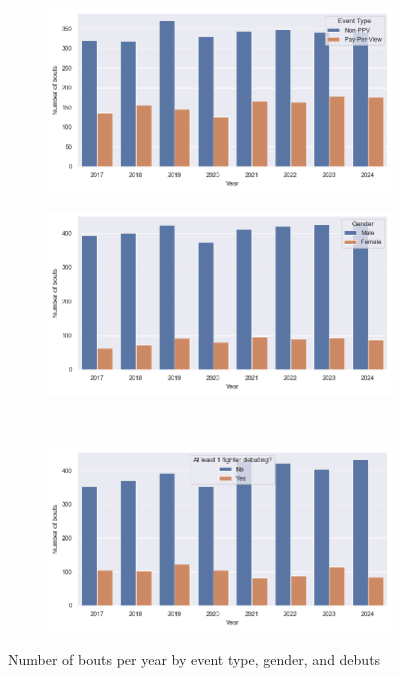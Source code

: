 \documentclass[12pt,twoside]{report}
\begin{document}
\begin{figure}[!htb]
\centering
\captionsetup{justification=centering}
\begin{subfigure}{0.42\linewidth}
  \centering
  \includegraphics[width=\linewidth]{figures/event_type_by_year.png}
\end{subfigure}
\begin{subfigure}{0.42\linewidth}
  \centering
  \includegraphics[width=\linewidth]{figures/gender_by_year.png}
\end{subfigure}\\
\begin{subfigure}{0.42\linewidth}
  \centering
  \includegraphics[width=\linewidth]{figures/debuts_by_year.png}
\end{subfigure}
\caption{Number of bouts per year by event type, gender, and debuts}
\end{figure}
\end{document}
